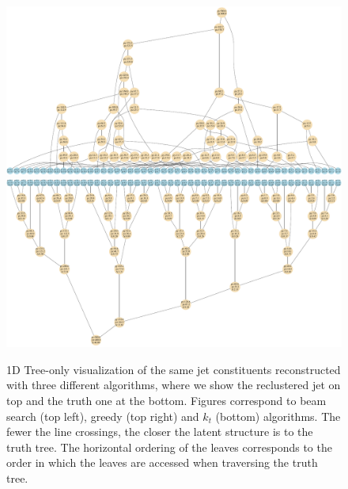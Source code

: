 \documentclass[12pt]{article}
\begin{document}
\begin{figure}
\begin{minipage}[c]{0.49\textwidth}
{	}
\end{minipage}
\begin{minipage}[c]{0.49\textwidth}
 	 {
	  \includegraphics[width=\textwidth]{plots/jet70kt_orderTruth.pdf}
	   \includegraphics[width=\textwidth]{plots/jet70Truth_orderTruth.pdf}
	}
\end{minipage}
\caption{\small{1D Tree-only visualization of the same jet constituents reconstructed with three different algorithms, where we show the reclustered jet on top and the truth one at the bottom. Figures correspond to beam search (top left), greedy (top right) and $k_t$ (bottom) algorithms. The fewer the line crossings, the closer the latent structure is to the truth tree. The horizontal ordering of the leaves corresponds to the order in which the leaves are accessed when traversing the truth tree. 
}}
\label{fig:1Dtree70}
\end{figure}
\end{document}
